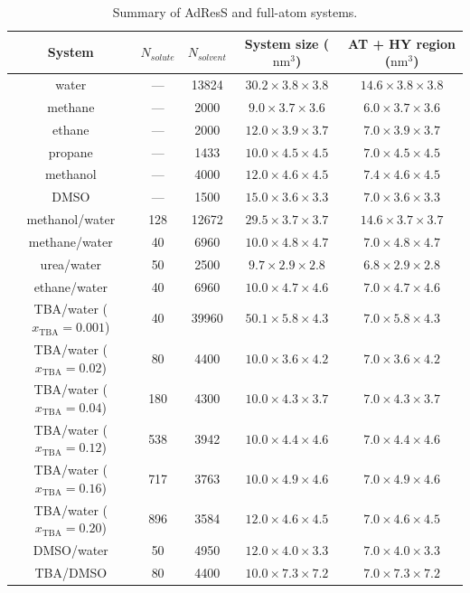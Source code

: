 \documentclass[a4paper,preprint,unsortedaddress]{revtex4-1}
\newcommand{\concenttba}{x_{\textrm{TBA}}}
\begin{document}
\begin{table}[]
\begin{center}
\begin{tabular}{ccccc}
\hline \hline
 System & $N_{solute}$ & $N_{solvent}$ & System size ($\textrm{nm}^{3}$) &  AT + HY region ($\textrm{nm}^{3}$)  \\
\hline
{water} & --- & 13824 & $30.2 \times 3.8 \times 3.8$ & $14.6 \times 3.8 \times 3.8$ \\
methane & --- & 2000 & $9.0 \times  3.7 \times 3.6$ & $6.0 \times 3.7 \times 3.6$ \\
ethane & --- & 2000 & $12.0 \times 3.9 \times 3.7$ & $7.0 \times 3.9 \times 3.7$ \\
propane & --- & 1433 & $10.0 \times 4.5 \times 4.5$ & $7.0 \times 4.5 \times 4.5$ \\
{methanol} & --- & 4000 & $12.0 \times 4.6 \times 4.5$ & $7.4 \times 4.6 \times 4.5$ \\
DMSO & --- & 1500 & $15.0 \times 3.6 \times 3.3$ &  $7.0 \times 3.6 \times 3.3$ \\
{methanol/water} & 128 & 12672 & $29.5 \times 3.7 \times 3.7$ & $14.6 \times 3.7 \times 3.7$ \\
{methane/water} & 40  & 6960 & $10.0 \times 4.8 \times 4.7$ & $7.0 \times 4.8 \times 4.7$ \\
urea/water & 50 & 2500 & $9.7 \times 2.9 \times 2.8$ & $6.8 \times 2.9 \times 2.8$ \\
{ethane/water} & 40 & 6960 & $10.0 \times 4.7 \times 4.6$ & $7.0 \times 4.7 \times 4.6$ \\
{TBA/water ($\concenttba=0.001$)} & 40 & 39960 & $50.1 \times 5.8 \times 4.3$ & $7.0 \times 5.8 \times 4.3$  \\
{TBA/water ($\concenttba=0.02$)} & 80 & 4400 & $10.0 \times 3.6 \times 4.2$ & $7.0 \times 3.6 \times 4.2$  \\
{TBA/water ($\concenttba=0.04$)} & 180 & 4300 & $10.0 \times 4.3 \times 3.7$ & $7.0 \times 4.3 \times 3.7$  \\
{TBA/water ($\concenttba=0.12$)} & 538 & 3942 & $10.0 \times 4.4 \times 4.6$ & $7.0 \times 4.4 \times 4.6$  \\
{TBA/water ($\concenttba=0.16$)} & 717 & 3763 & $10.0 \times 4.9 \times 4.6$ & $7.0 \times 4.9 \times 4.6$  \\
{TBA/water ($\concenttba=0.20$)} & 896 & 3584 & $12.0 \times 4.6 \times 4.5$ & $7.0 \times 4.6 \times 4.5$  \\
DMSO/water & 50 & 4950 & $12.0 \times 4.0 \times 3.3$ & $7.0 \times 4.0 \times 3.3$ \\
TBA/DMSO & 80 & 4400 & $10.0 \times 7.3 \times 7.2$ &  $7.0 \times 7.3 \times 7.2$ \\
\hline \hline
\end{tabular}
\caption{Summary of AdResS and full-atom systems.}
\label{table2}
\end{center}
\end{table}
\end{document}
